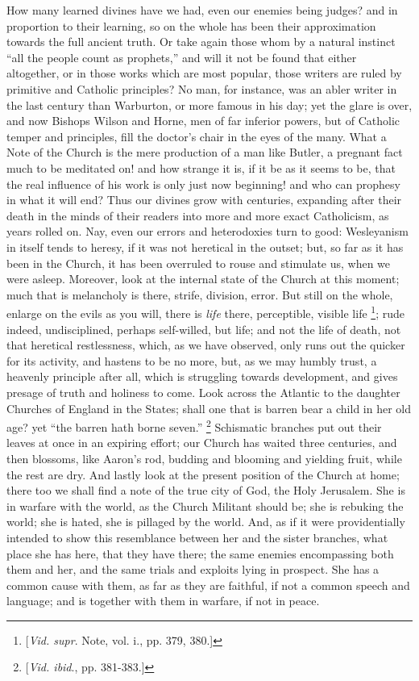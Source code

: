 How many learned divines have we had, even our
enemies being judges? and in proportion to their learning, so on the
whole has been their approximation towards the full ancient truth. Or
take again those whom by a natural instinct ``all the people count as
prophets,'' and will it not be found that either altogether, or in
those works which are most popular, those writers are ruled by
primitive and Catholic principles? No man, for instance, was an abler
writer in the last century than Warburton, or more famous in his day;
yet the glare is over, and now Bishops Wilson and Horne, men of far
inferior powers, but of Catholic temper and principles, fill the
doctor's chair in the eyes of the many. What a Note of the
Church is the mere production of a man like Butler, a pregnant fact
much to be meditated on! and how strange it is, if it be as it seems
to be, that the real influence of his work is only just now beginning!
and who can prophesy in what it will end? Thus our divines grow with
centuries, expanding after their death in the minds of their readers
into more and more exact Catholicism, as years rolled on. Nay, even
our errors and heterodoxies turn to good: Wesleyanism in itself tends
to heresy, if it was not heretical in the outset; but, so far as it
has been in the Church, it has been overruled to rouse and stimulate
us, when we were asleep. Moreover, look at the internal state of the
Church at this moment; much that is melancholy is there, strife,
division, error. But still on the whole, enlarge on the evils as you
will, there is \emph{life} there, perceptible, visible life \footnote{[\emph{Vid. supr}.
Note, vol. i., pp. 379,
380.]};
rude indeed, undisciplined, perhaps self-willed, but life; and not the
life of death, not that heretical restlessness, which, as we have
observed, only runs out the quicker for its activity, and hastens to
be no more, but, as we may humbly trust, a heavenly principle after
all, which is struggling towards development, and gives presage of
truth and holiness to come. Look across the Atlantic to the daughter
Churches of England in the States; shall one that is barren bear a
child in her old age? yet ``the barren hath borne seven.'' \footnote{[\emph{Vid. ibid}., pp. 381-383.]}
Schismatic branches put out their leaves at once in an expiring
effort; our Church has waited three centuries, and then blossoms, like
Aaron's rod, budding and blooming and yielding fruit, while the rest
are dry. And lastly look at the present position of the Church at
home; there too we shall find a note of the true city of God, the Holy
Jerusalem. She is in warfare with the world, as the Church
Militant should be; she is rebuking the world; she is hated, she is
pillaged by the world. And, as if it were providentially intended to
show this resemblance between her and the sister branches, what place
she has here, that they have there; the same enemies encompassing both
them and her, and the same trials and exploits lying in prospect. She
has a common cause with them, as far as they are faithful, if not a
common speech and language; and is together with them in warfare, if
not in peace.

